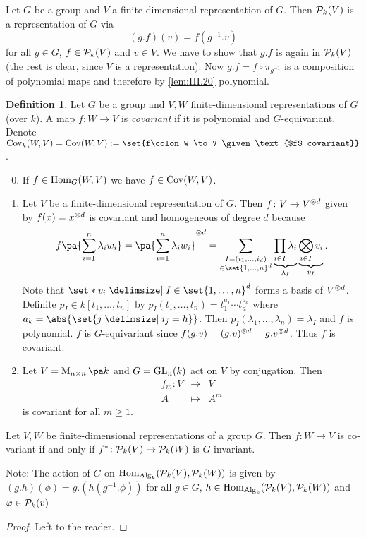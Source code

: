 \documentclass[12pt,a4paper]{scrartcl}
\theoremstyle{cplain}
\theoremstyle{cplain}
\theoremstyle{cplain}
\theoremstyle{definition}
\newtheorem*{deff}{Definition}
\begin{document}
\begin{otherlanguage}{english}
Let $G$ be a group and $V$ a finite-dimensional representation of $G$. Then $\mathcal{P}_k(V)$ is a representation of $G$ via \[ (g.f)(v) = f(g^{-1}.v) \] for all $g\in G$, $f\in\mathcal{P}_k(V)$ and $v \in V$.
We have to show that $g.f$ is again in $\mathcal{P}_k(V)$ (the rest is clear, since $V$ is a representation). Now $g .f = f \circ \pi_{g^{-1}}$ is a composition of polynomial maps and therefore by \cref{lem:III.20} polynomial.

\begin{deff}
  Let $G$ be a group and $V,W$ finite-dimensional representations of $G$ (over $k$). A map $f\colon W \to V$ is \emph{covariant} if it is polynomial and $G$-equivariant. Denote $\Cov_k(W,V) = \Cov(W,V) := \set{f\colon W \to V \given \text{$f$ covariant}}$. 
\end{deff}

\begin{enumerate}
  \setcounter{enumi}{-1}
  \item If $f\in \operatorname{Hom}_G(W,V)$ we have $f \in \operatorname{Cov}(W,V)$.
  \item Let $V$ be a finite-dimensional representation of $G$. Then $f \colon V \to V^{\otimes d}$ given by $f(x) = x^{\otimes d}$ is covariant and homogeneous of degree $d$ because \[ f\pa{\sum_{i=1}^n\lambda_iw_i} = \pa{\sum_{i=1}^n\lambda_iw_i}^{\tp d} = \sum_{{\substack{I=(i_1,\ldots,i_d)\\\in \set{1,\ldots,n}^d}}} \underbrace{\prod_{i\in I}\lambda_i}_{\lambda_I} \underbrace{\bigotimes_{i\in I} v_i}_{v_I}. \]
  Note that $\set*{v_i \given I \in \set{1,\ldots,n}^d}$ forms a basis of $V^{\otimes d}$. Definite $p_I\in k[t_1,\ldots,t_n]$ by $p_I(t_1,\ldots,t_n) = t_1^{a_1}\cdots t_d^{a_d}$ where $a_k = \abs{\set{j \given i_j = h}}$. Then $p_I(\lambda_1,\ldots,\lambda_n) = \lambda_I$ and $f$ is polynomial. $f$ is $G$-equivariant since $f(g.v) = (g.v)^{\otimes d} = g.v^{\otimes d}$. Thus $f$ is covariant.
  \item Let $V = \Mat n k$ and $G = \operatorname{GL}_n(k)$ act on $V$ by conjugation. Then
  \begin{eqnarray*}
   f_m \colon V &\to& V \\ A &\mapsto& A^m
  \end{eqnarray*}
  is covariant for all $m\ge 1$.
\end{enumerate}

\begin{lem}
  Let $V,W$ be finite-dimensional representations of a group $G$. Then $f \colon W \to V$ is covariant if and only if $f^* \colon \mathcal{P}_k(V) \to \mathcal{P}_k(W)$ is $G$-invariant.
\end{lem}
Note: The action of $G$ on $\operatorname{Hom}_{\operatorname{Alg}_k}(\mathcal{P}_k(V), \mathcal{P}_k(W))$ is given by $(g.h)(\phi) = g.(h(g^{-1}.\phi))$ for all $g \in G$, $h \in \operatorname{Hom}_{\operatorname{Alg}_k}(\mathcal{P}_k(V), \mathcal{P}_k(W))$ and $\varphi\in \mathcal{P}_k(v)$.
\begin{proof}
  Left to the reader.
\end{proof}


\end{otherlanguage}
\end{document}
